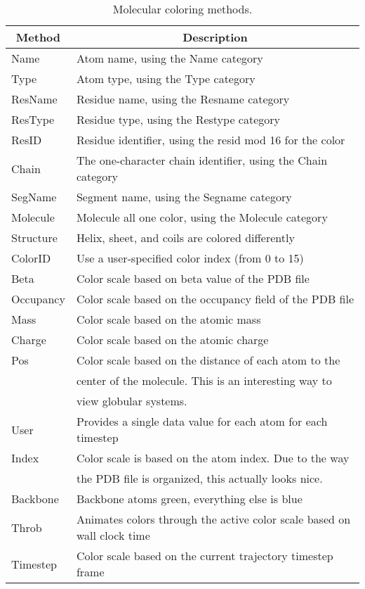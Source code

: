 \begin{table}[htb]
  \hspace{0.7in}
  \begin{tabular}{|l|l|} \hline
    \multicolumn{1}{|c}{Method} &
        \multicolumn{1}{|c|}{Description} \\ \hline\hline
    Name	& Atom name, using the Name category \\
    Type	& Atom type, using the Type category \\
    ResName	& Residue name, using the Resname category \\
    ResType	& Residue type, using the Restype category \\
    ResID	& Residue identifier, using the resid mod 16 for the color \\
    Chain	& The one-character chain identifier,
			using the Chain category \\
    SegName	& Segment name, using the Segname category \\
    Molecule	& Molecule all one color, using the Molecule category \\
    Structure	& Helix, sheet, and coils are colored differently \\
    ColorID	& Use a user-specified color index (from 0 to 15) \\
    Beta	& Color scale based on beta value of the PDB file \\
    Occupancy	& Color scale based on the occupancy field of the PDB file \\
    Mass	& Color scale based on the atomic mass \\
    Charge	& Color scale based on the atomic charge \\
    Pos		& Color scale based on the distance of each atom to the \\
		& center of the molecule.  This is an interesting way to \\
		& view globular systems.  \\
    User        & Provides a single data value for each atom for each timestep \\
    Index	& Color scale is based on the atom index.  Due to the way \\
		& the PDB file is organized, this actually looks nice.  \\
    Backbone	& Backbone atoms green, everything else is blue \\ 
    Throb	& Animates colors through the active color scale based on wall clock time \\ 
    Timestep	& Color scale based on the current trajectory timestep frame \\
  \hline
  \end{tabular}
  \caption{Molecular coloring methods.}
  \label{table:ug:colormethods}
\end{table}


